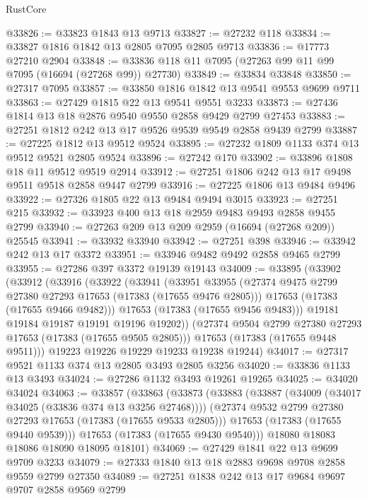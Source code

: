 \begin{lexlean}{RustCore}
\begin{coremodule}
@33826 := @33823 @1843 @13 @9713
@33827 := @27232 @118
@33834 := @33827 @1816 @1842 @13 @2805 @7095 @2805 @9713
@33836 := @17773 @27210 @2904
@33848 := @33836 @118 @11 @7095 (@27263 @99 @11 @99 @7095 (@16694 (@27268 @99)) @27730)
@33849 := @33834 @33848
@33850 := @27317 @7095
@33857 := @33850 @1816 @1842 @13 @9541 @9553 @9699 @9711
@33863 := @27429 @1815 @22 @13 @9541 @9551 @3233
@33873 := @27436 @1814 @13 @18 @2876 @9540 @9550 @2858 @9429 @2799 @27453
@33883 := @27251 @1812 @242 @13 @17 @9526 @9539 @9549 @2858 @9439 @2799
@33887 := @27225 @1812 @13 @9512 @9524
@33895 := @27232 @1809 @1133 @374 @13 @9512 @9521 @2805 @9524
@33896 := @27242 @170
@33902 := @33896 @1808 @18 @11 @9512 @9519 @2914
@33912 := @27251 @1806 @242 @13 @17 @9498 @9511 @9518 @2858 @9447 @2799
@33916 := @27225 @1806 @13 @9484 @9496
@33922 := @27326 @1805 @22 @13 @9484 @9494 @3015
@33923 := @27251 @215
@33932 := @33923 @400 @13 @18 @2959 @9483 @9493 @2858 @9455 @2799
@33940 := @27263 @209 @13 @209 @2959 (@16694 (@27268 @209)) @25545
@33941 := @33932 @33940
@33942 := @27251 @398
@33946 := @33942 @242 @13 @17 @3372
@33951 := @33946 @9482 @9492 @2858 @9465 @2799
@33955 := @27286 @397 @3372 @19139 @19143
@34009 := @33895
    (@33902
      (@33912
        (@33916
          (@33922
            (@33941
              (@33951
                @33955
                (@27374 @9475 @2799 @27380 @27293 @17653 (@17383 (@17655 @9476 @2805)))
                @17653
                (@17383 (@17655 @9466 @9482)))
              @17653
              (@17383 (@17655 @9456 @9483)))
            @19181
            @19184
            @19187
            @19191
            @19196
            @19202))
        (@27374 @9504 @2799 @27380 @27293 @17653 (@17383 (@17655 @9505 @2805)))
        @17653
        (@17383 (@17655 @9448 @9511)))
      @19223
      @19226
      @19229
      @19233
      @19238
      @19244)
@34017 := @27317 @9521 @1133 @374 @13 @2805 @3493 @2805 @3256
@34020 := @33836 @1133 @13 @3493
@34024 := @27286 @1132 @3493 @19261 @19265
@34025 := @34020 @34024
@34063 := @33857
    (@33863
      (@33873
        (@33883
          (@33887 (@34009 (@34017 @34025 (@33836 @374 @13 @3256 @27468))))
          (@27374 @9532 @2799 @27380 @27293 @17653 (@17383 (@17655 @9533 @2805)))
          @17653
          (@17383 (@17655 @9440 @9539)))
        @17653
        (@17383 (@17655 @9430 @9540)))
      @18080
      @18083
      @18086
      @18090
      @18095
      @18101)
@34069 := @27429 @1841 @22 @13 @9699 @9709 @3233
@34079 := @27333 @1840 @13 @18 @2883 @9698 @9708 @2858 @9559 @2799 @27350
@34089 := @27251 @1838 @242 @13 @17 @9684 @9697 @9707 @2858 @9569 @2799

\end{coremodule}
\end{lexlean}
